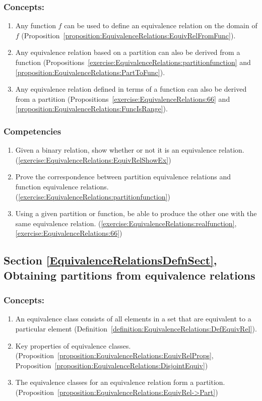 \subsubsection*{Concepts:}
\begin{enumerate}
\item 
Any function $f$ can be used to define an equivalence relation on the domain of $f$ (Proposition~\ref{proposition:EquivalenceRelations:EquivRelFromFunc}).
\item
Any equivalence relation based on a partition can also be derived from a function (Propositions~\ref{exercise:EquivalenceRelations:partitionfunction} and \ref{proposition:EquivalenceRelations:PartToFunc}).
\item
Any equivalence relation defined in terms of a function can also be derived from a partition (Propositions~\ref{exercise:EquivalenceRelations:66} and \ref{proposition:EquivalenceRelations:FuncIsRange}).

\end{enumerate}

\subsubsection*{Competencies}
\begin{enumerate}
\item
Given a binary relation, show whether or not it is an equivalence relation. (\ref{exercise:EquivalenceRelations:EquivRelShowEx})
\item
Prove the correspondence between partition equivalence relations and function equivalence relations. (\ref{exercise:EquivalenceRelations:partitionfunction})
\item
Using a given partition or function, be able to produce the other one with the same equivalence relation.  (\ref{exercise:EquivalenceRelations:realfunction}, \ref{exercise:EquivalenceRelations:66})
\end{enumerate}


\subsection*{Section \ref{EquivalenceRelationsDefnSect}, Obtaining partitions from equivalence relations}
\subsubsection*{Concepts:}
\begin{enumerate}
\item 
An equivalence class consists of all elements in a set that are equivalent to a particular element (Definition~\ref{definition:EquivalenceRelations:DefEquivRel}).
\item
Key properties of equivalence classes.  (Proposition~\ref{proposition:EquivalenceRelations:EquivRelProps}, Proposition~\ref{proposition:EquivalenceRelations:DisjointEquiv})
\item
The equivalence classes for an equivalence relation  form a partition.   (Proposition~\ref{proposition:EquivalenceRelations:EquivRel->Part})
\end{enumerate}

